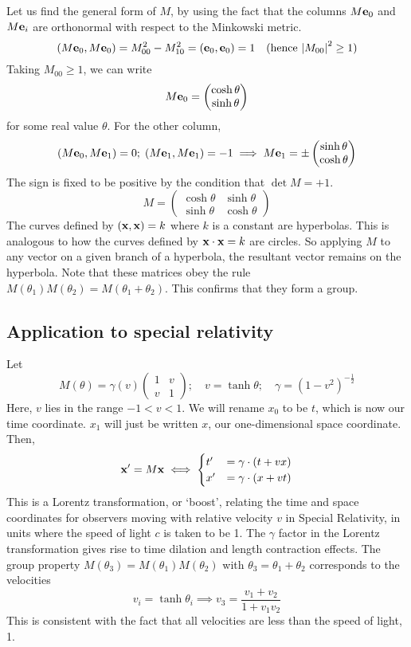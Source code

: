 Let us find the general form of \(M\), by using the fact that the columns \(M \vb e_0\) and \(M \vb e_i\) are orthonormal with respect to the Minkowski metric.
\[
	(M \vb e_0, M \vb e_0) = M_{00}^2 - M_{10}^2 = (\vb e_0, \vb e_0) = 1\quad (\text{hence } \abs{M_{00}}^2 \geq 1)
\]
Taking \(M_{00} \geq 1\), we can write
\[
	M\vb e_0 = \begin{pmatrix}
		\cosh \theta \\ \sinh \theta
	\end{pmatrix}
\]
for some real value \(\theta\).
For the other column,
\[
	(M \vb e_0, M \vb e_1) = 0;\; (M \vb e_1, M \vb e_1) = -1 \implies M \vb e_1 = \pm\begin{pmatrix}
		\sinh \theta \\
		\cosh \theta
	\end{pmatrix}
\]
The sign is fixed to be positive by the condition that \(\det M = +1\).
\[
	M = \begin{pmatrix}
		\cosh \theta & \sinh \theta \\
		\sinh \theta & \cosh \theta
	\end{pmatrix}
\]
The curves defined by \((\vb x, \vb x) = k\) where \(k\) is a constant are hyperbolas.
This is analogous to how the curves defined by \(\vb x \cdot \vb x = k\) are circles.
So applying \(M\) to any vector on a given branch of a hyperbola, the resultant vector remains on the hyperbola.
Note that these matrices obey the rule \(M(\theta_1) M(\theta_2) = M(\theta_1 + \theta_2)\).
This confirms that they form a group.

\subsection{Application to special relativity}
Let
\[
	M(\theta) = \gamma(v) \begin{pmatrix}
		1 & v \\ v & 1
	\end{pmatrix};\quad v = \tanh \theta;\quad \gamma = (1 - v^2)^{-\frac{1}{2}}
\]
Here, \(v\) lies in the range \(-1 < v < 1\).
We will rename \(x_0\) to be \(t\), which is now our time coordinate.
\(x_1\) will just be written \(x\), our one-dimensional space coordinate.
Then,
\[
	\vb x' = M\vb x \iff \begin{cases}
		t' & = \gamma \cdot (t + vx) \\
		x' & = \gamma \cdot (x + vt)
	\end{cases}
\]
This is a Lorentz transformation, or `boost', relating the time and space coordinates for observers moving with relative velocity \(v\) in Special Relativity, in units where the speed of light \(c\) is taken to be 1.
The \(\gamma\) factor in the Lorentz transformation gives rise to time dilation and length contraction effects.
The group property \(M(\theta_3) = M(\theta_1)M(\theta_2)\) with \(\theta_3 = \theta_1 + \theta_2\) corresponds to the velocities
\[
	v_i = \tanh \theta_i \implies v_3 = \frac{v_1 + v_2}{1 + v_1 v_2}
\]
This is consistent with the fact that all velocities are less than the speed of light, 1.
